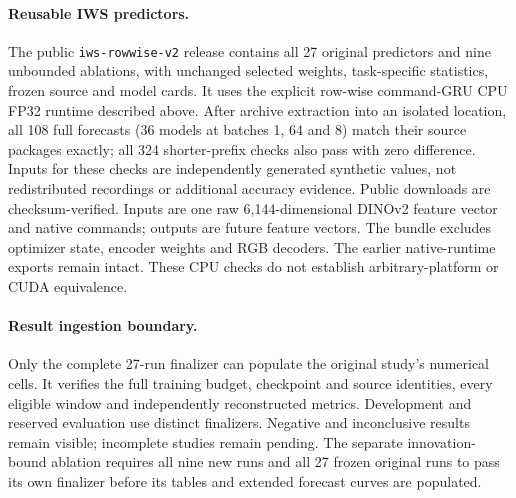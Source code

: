 \paragraph{Reusable IWS predictors.}
The public \texttt{iws-rowwise-v2} release contains all 27 original predictors
and nine unbounded ablations, with unchanged selected weights, task-specific
statistics, frozen source and model cards. It uses the explicit row-wise
command-GRU CPU FP32 runtime described above. After archive extraction into an
isolated location, all 108 full forecasts (36 models at batches 1, 64 and 8)
match their source packages exactly; all 324 shorter-prefix checks also pass
with zero difference. Inputs for these checks are independently generated
synthetic values, not redistributed recordings or additional accuracy evidence.
Public downloads are checksum-verified. Inputs are one raw 6,144-dimensional
DINOv2 feature vector and native commands; outputs are future feature vectors.
The bundle excludes optimizer state, encoder weights and RGB decoders.
The earlier native-runtime exports remain intact. These CPU checks do not
establish arbitrary-platform or CUDA equivalence.

\paragraph{Result ingestion boundary.}
Only the complete 27-run finalizer can populate the original study's numerical cells. It verifies
the full training budget, checkpoint and source identities, every eligible
window and independently reconstructed metrics. Development and reserved
evaluation use distinct finalizers. Negative and inconclusive results remain
visible; incomplete studies remain pending. The separate innovation-bound
ablation requires all nine new runs and all 27 frozen original runs to pass
its own finalizer before its tables and extended forecast curves are populated.


